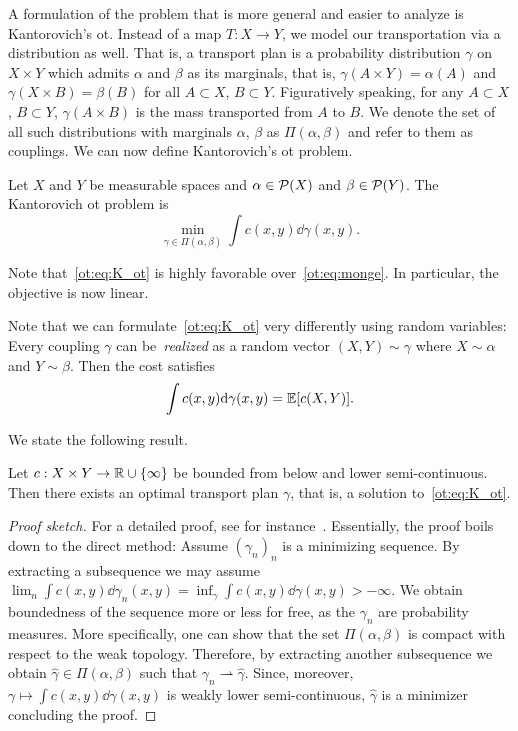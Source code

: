 A formulation of the problem that is more general and easier to analyze is Kantorovich's \gls{ot}. Instead of a map $T:X\rightarrow Y$, we model our transportation via a distribution as well. That is, a transport plan is a probability distribution $\gamma$ on $X\times Y$ which admits $\alpha$ and $\beta$ as its marginals, that is, $\gamma(A\times Y) = \alpha(A)$ and $\gamma(X\times B) = \beta(B)$ for all $A\subset X$, $B\subset Y$. Figuratively speaking, for any $A\subset X$, $B\subset Y$, $\gamma(A\times B)$ is the mass transported from $A$ to $B$. We denote the set of all such distributions with marginals $\alpha$, $\beta$ as $\Pi(\alpha,\beta)$ and refer to them as couplings. We can now define Kantorovich's \gls{ot} problem.
\begin{defn}
    Let $X$ and $Y$ be measurable spaces and $\alpha\in \mathcal{P}(X)$ and $\beta\in \mathcal{P}(Y)$. The Kantorovich \gls{ot} problem is 
    \begin{equation}\label{ot:eq:K_ot}
        \min_{\gamma\in\Pi(\alpha,\beta)} \int c(x,y)\dd\gamma(x,y).
    \end{equation}
\end{defn}
Note that~\eqref{ot:eq:K_ot} is highly favorable over~\eqref{ot:eq:monge}. In particular, the objective is now linear.

\begin{rem}
    Note that we can formulate~\eqref{ot:eq:K_ot} very differently using random variables: Every coupling $\gamma$ can be~\emph{realized} as a random vector $(X,Y)\sim\gamma$ where $X\sim \alpha$ and $Y\sim \beta$. Then the cost satisfies
    \begin{equation}
        \int c(x,y)\mathrm{d} \gamma(x,y) = \mathbb{E}[c(X,Y)].
    \end{equation}
\end{rem}

We state the following result.
\begin{theorem}
    Let $c:X\times Y\rightarrow \mathbb{R}\cup\{\infty\}$ be bounded from below and lower semi-continuous. Then there exists an optimal transport plan $\gamma$, that is, a solution to~\eqref{ot:eq:K_ot}.
\end{theorem}
\begin{proof}[Proof sketch]
    For a detailed proof, see for instance~\cite[Theorem 4.1]{villani2009optimal}. Essentially, the proof boils down to the direct method: Assume $(\gamma_n)_n$ is a minimizing sequence. By extracting a subsequence we may assume $\lim_n \int c(x,y)\dd \gamma_n(x,y) = \inf_\gamma \int c(x,y)\dd \gamma(x,y)>-\infty$. We obtain boundedness of the sequence more or less for free, as the $\gamma_n$ are probability measures. More specifically, one can show that the set $\Pi(\alpha,\beta)$ is compact with respect to the weak topology. Therefore, by extracting another subsequence we obtain $\hat\gamma\in\Pi(\alpha,\beta)$ such that $\gamma_n\rightharpoonup \hat \gamma$. Since, moreover, $\gamma\mapsto \int c(x,y)\dd \gamma(x,y)$ is weakly lower semi-continuous, $\hat\gamma$ is a minimizer concluding the proof.
\end{proof}

